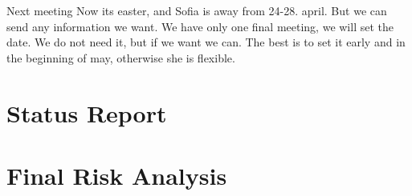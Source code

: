 Next meeting
Now its easter, and Sofia is away from 24-28. april. But we can send any information we want. 
We have only one final meeting, we will set the date. We do not need it, but if we want we can. 
The best is to set it early and in the beginning of may, otherwise she is flexible. 


\section{Status Report}
\label{status_report}

\section{Final Risk Analysis}
\label{final_risk_analysis}

\cleardoublepage